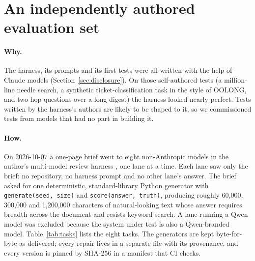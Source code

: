 \documentclass[11pt]{article}
\newcommand{\code}[1]{\texttt{#1}}
\begin{document}
\section{An independently authored evaluation set}
\label{sec:tasks}

\paragraph{Why.} The harness, its prompts and its first tests were all written with
the help of Claude models (Section~\ref{sec:disclosure}). On those self-authored
tests (a million-line needle search, a synthetic ticket-classification task in the
style of OOLONG, and two-hop questions over a long digest) the harness looked
nearly perfect. Tests written by the harness's authors are likely to be shaped to
it, so we commissioned tests from models that had no part in building it.

\paragraph{How.} On 2026-10-07 a one-page brief went to eight non-Anthropic models
in the author's multi-model review harness \citep{flatline}, one lane at a time. Each
lane saw only the brief: no repository, no harness prompt and no other lane's
answer. The brief asked for one deterministic, standard-library Python generator
with \code{generate(seed, size)} and \code{score(answer, truth)}, producing
roughly 60,000, 300,000 and 1,200,000 characters of natural-looking text whose
answer requires breadth across the document and resists keyword search. A lane
running a Qwen model was excluded because the system under test is also a Qwen-branded model.
Table~\ref{tab:tasks} lists the eight tasks. The generators are kept byte-for-byte as
delivered; every repair lives in a separate file with its provenance, and every
version is pinned by SHA-256 in a manifest that CI checks.
\end{document}
